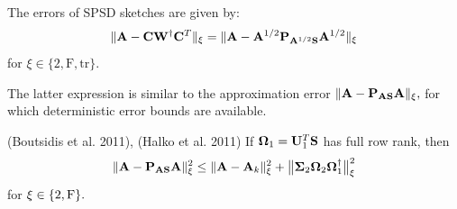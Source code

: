 \documentclass[xcolor=x11names,compress,ignorenonframetext,10pt]{beamer}
\renewcommand{\(}{\begin{columns}}
\renewcommand{\)}{\end{columns}}
\newcommand{\<}[1]{\begin{column}{#1}}
\renewcommand{\>}{\end{column}}
\def\refcolor{DodgerBlue4}
\newcommand{\refer}[1]{({\color{\refcolor}#1})}
\begin{document}
\begin{frame}

 The errors of SPSD sketches are given by: 
 \[
   \|\mathbf{A} - \mathbf{C}\mathbf{W}^\dagger \mathbf{C}^T\|_\xi =
   \|\mathbf{A} - \mathbf{A}^{1/2} \mathbf{P}_{\mathbf{A}^{1/2} \mathbf{S}} \mathbf{A}^{1/2}\|_\xi
 \]
 for $\xi \in \{2, \mathrm{F}, \mathrm{tr}\}.$
 \vspace{0.7em}
 
 The latter expression is similar to the approximation error $\|\mathbf{A} - \mathbf{P}_{\mathbf{A}\mathbf{S}} \mathbf{A}\|_\xi,$ for which
 deterministic error bounds are available.
 
  \begin{block}{\refer{Boutsidis et al. 2011}, \refer{Halko et al. 2011} }
  If $\boldsymbol{\Omega}_1 = \mathbf{U}_1^T \mathbf{S}$ has full row rank, then
  \[
   \|\mathbf{A} - \mathbf{P}_{\mathbf{A}\mathbf{S}} \mathbf{A}\|_\xi^2 \leq \|\mathbf{A} - \mathbf{A}_k\|_\xi^2 + \big\| \boldsymbol{\Sigma}_2 \boldsymbol{\Omega}_2 \boldsymbol{\Omega}_1^\dagger\big\|_\xi^2
  \]
  for $\xi \in \{2, \mathrm{F}\}.$
 \end{block}

\end{frame}
\end{document}
